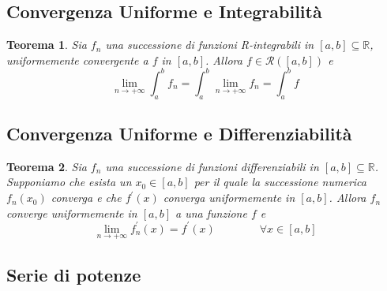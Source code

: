 \documentclass[a4paper,12pt]{article}
\newcommand{\Rint}{\mathcal{R}}
\newtheorem{teo}{Teorema}
\begin{document}
\subsection{Convergenza Uniforme e Integrabilità}
\begin{teo}
Sia ${f_n}$ una successione di funzioni R-integrabili in $[a,b]\subseteq \mathbb{R}$, uniformemente convergente a $f$ in $[a,b]$. Allora $f\in \Rint([a,b])$ e
$$\lim_{n\to+\infty}\int_{a}^{b} f_n=\int_{a}^{b}\lim_{n\to+\infty} f_n=\int_{a}^{b}f$$
\end{teo}
\subsection{Convergenza Uniforme e Differenziabilità}
\begin{teo}
Sia $f_n$ una successione di funzioni differenziabili in  $[a,b]\subseteq \mathbb{R}$. Supponiamo che esista un $x_{0} \in [a,b] $ per il quale la successione numerica ${f_n(x_0)}$ converga e che ${f^{'}(x)}$ converga uniformemente in $[a,b]$. Allora ${f_n}$ converge uniformemente in $[a,b]$ a una funzione $f$ e
$$\lim_{n\to+\infty} f^{'}_n (x)=f^{'}(x) \qquad \qquad \forall x \in [a,b]$$
\end{teo}

\subsection{Serie di potenze}
\end{document}
